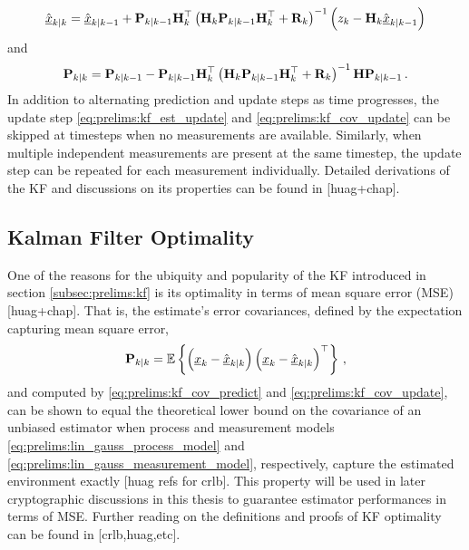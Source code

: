 \begin{equation}\label{eq:prelims:kf_est_update}
    \hat{{\underline{x}}}_{k|k} = \hat{{\underline{x}}}_{k|k-1}+{{\mathbf{P}}}_{k|k-1}{{\mathbf{H}}}_k^\top\left({{\mathbf{H}}}_k{{\mathbf{P}}}_{k|k-1}{{\mathbf{H}}}_k^\top + {{\mathbf{R}}}_k\right)^{-1}\left(z_k-{{\mathbf{H}}}_k\hat{{\underline{x}}}_{k|k-1}\right)
\end{equation}
and
\begin{equation}\label{eq:prelims:kf_cov_update}
    {\ensuremath{{\mathbf{P}}}}_{k|k} = {{\mathbf{P}}}_{k|k-1}-{{\mathbf{P}}}_{k|k-1}{{\mathbf{H}}}_k^\top\left({{\mathbf{H}}}_k{{\mathbf{P}}}_{k|k-1}{{\mathbf{H}}}_k^\top + {{\mathbf{R}}}_k\right)^{-1}{{\mathbf{H}}}{{\mathbf{P}}}_{k|k-1}\,.
\end{equation}
In addition to alternating prediction and update steps as time progresses, the update step \eqref{eq:prelims:kf_est_update} and \eqref{eq:prelims:kf_cov_update} can be skipped at timesteps when no measurements are available. Similarly, when multiple independent measurements are present at the same timestep, the update step can be repeated for each measurement individually. Detailed derivations of the KF and discussions on its properties can be found in [huag+chap].

% 
% 

\subsection{Kalman Filter Optimality}\label{subsec:prelims:kf_opt}
One of the reasons for the ubiquity and popularity of the KF introduced in section \ref{subsec:prelims:kf} is its optimality in terms of mean square error (MSE) [huag+chap]. That is, the estimate's error covariances, defined by the expectation capturing mean square error,
\begin{equation}
    {\ensuremath{{\mathbf{P}}}}_{k|k} = \mathbb{E}\left\{\left({\underline{x}}_k - \hat{{\underline{x}}}_{k|k}\right)\left({\underline{x}}_k - \hat{{\underline{x}}}_{k|k}\right)^\top\right\}\,,
\end{equation}
and computed by \eqref{eq:prelims:kf_cov_predict} and \eqref{eq:prelims:kf_cov_update}, can be shown to equal the theoretical lower bound on the covariance of an unbiased estimator when process and measurement models \eqref{eq:prelims:lin_gauss_process_model} and \eqref{eq:prelims:lin_gauss_measurement_model}, respectively, capture the estimated environment exactly [huag refs for crlb]. This property will be used in later cryptographic discussions in this thesis to guarantee estimator performances in terms of MSE. Further reading on the definitions and proofs of KF optimality can be found in [crlb,huag,etc].

